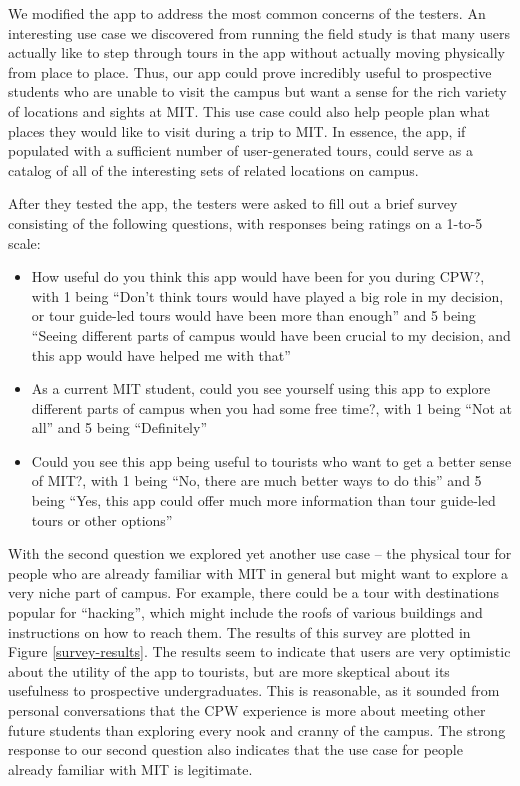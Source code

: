 \documentclass{sigchi}
\begin{document}
We modified the app to address the most common concerns of the testers. An interesting use case we discovered from running the field study is that many users actually like to step through tours in the app without actually moving physically from place to place. Thus, our app could prove incredibly useful to prospective students who are unable to visit the campus but want a sense for the rich variety of locations and sights at MIT. This use case could also help people plan what places they would like to visit during a trip to MIT. In essence, the app, if populated with a sufficient number of user-generated tours, could serve as a catalog of all of the interesting sets of related locations on campus.

After they tested the app, the testers were asked to fill out a brief survey consisting of the following questions, with responses being ratings on a 1-to-5 scale:
\begin{itemize}
\item How useful do you think this app would have been for you during CPW?, with 1 being ``Don't think tours would have played a big role in my decision, or tour guide-led tours would have been more than enough'' and 5 being ``Seeing different parts of campus would have been crucial to my decision, and this app would have helped me with that''
\item As a current MIT student, could you see yourself using this app to explore different parts of campus when you had some free time?, with 1 being ``Not at all'' and 5 being ``Definitely''
\item Could you see this app being useful to tourists who want to get a better sense of MIT?, with 1 being ``No, there are much better ways to do this'' and 5 being ``Yes, this app could offer much more information than tour guide-led tours or other options''
\end{itemize}
With the second question we explored yet another use case -- the physical tour for people who are already familiar with MIT in general but might want to explore a very niche part of campus. For example, there could be a tour with destinations popular for ``hacking'', which might include the roofs of various buildings and instructions on how to reach them. The results of this survey are plotted in Figure \ref{survey-results}. The results seem to indicate that users are very optimistic about the utility of the app to tourists, but are more skeptical about its usefulness to prospective undergraduates. This is reasonable, as it sounded from personal conversations that the CPW experience is more about meeting other future students than exploring every nook and cranny of the campus. The strong response to our second question also indicates that the use case for people already familiar with MIT is legitimate.
\end{document}
